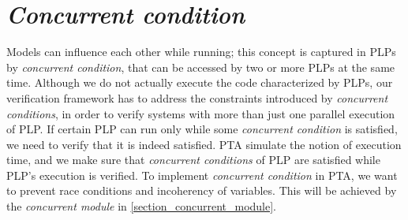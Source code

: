 \section{\textit{Concurrent condition} \label{plp_to_pta_concurrent_condition}}
Models can influence each other while running; this concept is captured in PLPs by \textit{concurrent condition}, that can be accessed by two or more PLPs at the same time. Although we do not actually execute the code characterized by PLPs, our verification framework has to address the constraints introduced by \textit{concurrent conditions}, in order to verify systems with more than just one parallel execution of PLP. If certain PLP can run only while some \textit{concurrent condition} is satisfied, we need to verify that it is indeed satisfied. PTA simulate the notion of execution time, and we make sure that \textit{concurrent conditions} of PLP are satisfied while PLP’s execution is verified. To implement \textit{concurrent condition} in PTA, we want to prevent race conditions and incoherency of variables. This will be achieved by the \textit{concurrent module} in \ref{section_concurrent_module}. \\
